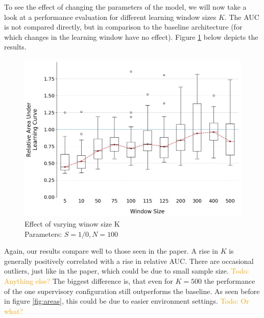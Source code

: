 \documentclass[letterpaper]{article}
\newcommand\todo[1]{\textcolor{orange}{Todo: #1}}
\begin{document}
To see the effect of changing the parameters of the model, we will now take a look at a performance evaluation for different learning window sizes $K$. The AUC is not compared directly, but in comparison to the baseline architecture (for which changes in the learning window have no effect). Figure \ref{fig:windows} below depicts the results.
\begin{figure}[H]
 \begin{center}
  \includegraphics[width=\linewidth]{figures/figure4_extended}
  \caption{Effect of varying winow size K\\Parameters: $S=1/0,N=100$}
  \label{fig:windows}
 \end{center}
\end{figure}

Again, our results compare well to those seen in the paper. A rise in $K$ is generally positively correlated with a rise in relative AUC. There are occasional outliers, just like in the paper, which could be due to small sample size. \todo{Anything else?} The biggest difference is, that even for $K=500$ the performance of the one supervisory configuration still outperforms the baseline. As seen before in figure \ref{fig:areas}, this could be due to easier environment settings. \todo{Or what?}
\end{document}
